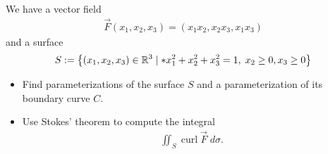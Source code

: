 \documentclass[11pt]{article}
\begin{document}
\begin{exercise}
    We have a vector field 
    \begin{align*}
        \vec F( x_1, x_2, x_3 ) = \left( x_1 x_2, x_2 x_3, x_1 x_3 \right)
    \end{align*}
    and a surface 
    \begin{align*}
        S := \left\{ (x_1,x_2,x_3) \in \bbR^{3} \suchthat* x_1^2 + x_2^2 + x_3^2 = 1, \; x_2 \geq 0, x_3 \geq 0 \right\} 
    \end{align*}
    \begin{itemize}
        \item Find parameterizations of the surface $S$ and a parameterization of its boundary curve $C$.
        \item Use Stokes' theorem to compute the integral 
        \begin{align*}
            \iint_{S} \operatorname{curl} \vec F \;d\sigma.
        \end{align*}
    \end{itemize}
\end{exercise}
\end{document}
